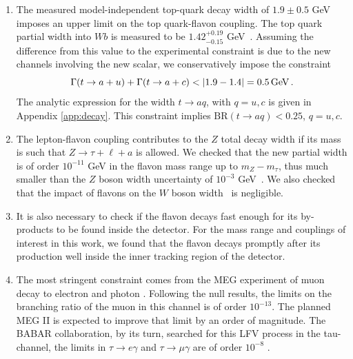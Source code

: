 \documentclass[prd,amsfonts,onecolumn,superscriptaddress,aps,nofootinbib,11pt]{revtex4-1}
\begin{document}
\begin{enumerate}
\item The measured model-independent top-quark decay width of $1.9 \pm 0.5$ GeV~\cite{ParticleDataGroup:2022pth} imposes an upper limit on the top quark-flavon coupling. The top quark partial width into $Wb$ is measured to be $1.42^{+0.19}_{-0.15}$ GeV~\cite{ParticleDataGroup:2022pth}. Assuming the difference from this value to the experimental constraint is due to the new channels involving the new scalar, we conservatively impose the constraint
\begin{equation}
\Gamma(t\to a+u)+\Gamma(t\to a+c) < |1.9-1.4|=0.5 \, \hbox{GeV}\, . 
\label{eq:br}
\end{equation}
The analytic expression for the width $t \to aq$, with $q = u,c$ is given in Appendix \ref{app:decay}. This constraint implies $\mathrm{BR}(t\to aq)<0.25$, $q=u,c$.

\item The lepton-flavon coupling contributes to the $Z$ total decay width if its mass is such that $Z\to \tau+\ell+a$ is allowed. We checked that the new partial width is of order $10^{-11}$ GeV in the flavon mass range up to $m_Z-m_\tau$, thus much smaller than the $Z$ boson width uncertainty of $10^{-3}$ GeV~\cite{2006257}. We also checked that the impact of flavons on the $W$ boson width~\cite{https://doi.org/10.48550/arxiv.1012.2367} is negligible.

\item It is also necessary to check if the flavon decays fast enough for its by-products to be found inside the detector. For the mass range and couplings of interest in this work, we found that the flavon decays promptly after its production well inside the inner tracking region of the detector.

\item The most stringent constraint comes from the MEG experiment of muon decay to electron and photon \cite{https://doi.org/10.48550/arxiv.1605.05081}. Following the null results,  the limits on the branching ratio of the muon in this channel is of order $10^{-13}$. The planned MEG II is expected to improve that limit by an order of magnitude. The BABAR collaboration, by its turn, searched for this LFV process in the tau-channel, the limits in $\tau \rightarrow e \gamma$ and $\tau \rightarrow \mu\gamma$ are of order $10^{-8}$ \cite{BaBar:2009hkt}. 

\end{enumerate}
\end{document}
